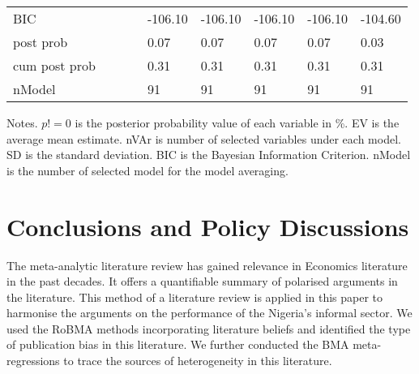 \documentclass[a4paper, 12pt]{article}
\begin{document}
\begin{table}[H]
{\begin{tabular}{@{}lllllllll@{}}
                BIC                         &        &         &        & -106.10 & -106.10 & -106.10 & -106.10 & -104.60 \\
                post prob                   &        &         &        & 0.07    & 0.07    & 0.07    & 0.07    & 0.03    \\
                cum post prob               &        &         &        & 0.31    & 0.31    & 0.31    & 0.31    & 0.31    \\
                nModel                      &        &         &        & 91      & 91      & 91      & 91      & 91      \\ \bottomrule
            \end{tabular}%
        }
        \begin{minipage}{19cm}
            \vspace{0.1cm}
            \small Notes. $p!=0$ is the posterior probability value of each variable in \%. EV is the average mean estimate. nVAr is number of selected variables under each model. SD is the standard deviation. BIC is the Bayesian Information Criterion. nModel is the number of selected model for the model averaging.
        \end{minipage}
    \end{table}


    \section{Conclusions and Policy Discussions}\label{sec:conclusions-and-policy-discussions}
    The meta-analytic literature review has gained relevance in Economics literature in the past decades. It offers a quantifiable summary of polarised arguments in the literature. This method of a literature review is applied in this paper to harmonise the arguments on the performance of the Nigeria's informal sector. We used the RoBMA methods incorporating literature beliefs and identified the type of publication bias in this literature. We further conducted the BMA meta-regressions to trace the sources of heterogeneity in this literature.
\end{document}
